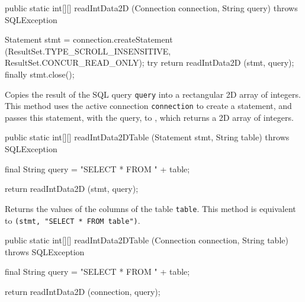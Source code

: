 \begin{code}

   public static int[][] readIntData2D (Connection connection, String query)
            throws SQLException\begin{hide} {
      Statement stmt = connection.createStatement
      (ResultSet.TYPE_SCROLL_INSENSITIVE, ResultSet.CONCUR_READ_ONLY);
      try {
         return readIntData2D (stmt, query);
      }
      finally {
         stmt.close();
      }
   }\end{hide}
\end{code}
\begin{tabb}
   Copies the result of the SQL query \texttt{query} into a rectangular 2D array
   of integers.
   This method uses the active connection \texttt{connection} to create
   a statement, and passes this statement, with the query, to
   , which returns a 2D
   array of integers.
\end{tabb}
\begin{htmlonly}
\end{htmlonly}
\begin{code}

   public static int[][] readIntData2DTable (Statement stmt, String table)
            throws SQLException\begin{hide} {
        final String query = "SELECT * FROM " + table;
        
        return readIntData2D (stmt, query);
    }\end{hide}
\end{code}
\begin{tabb}
   Returns the values of the columns of the table \texttt{table}.
   This method is equivalent to 
   \texttt{(stmt, "SELECT * FROM table")}.
\end{tabb}
\begin{code}

   public static int[][] readIntData2DTable (Connection connection,
                                             String table)
            throws SQLException\begin{hide} {
        final String query = "SELECT * FROM " + table;
        
        return readIntData2D (connection, query);
    }\end{hide}
\end{code}
